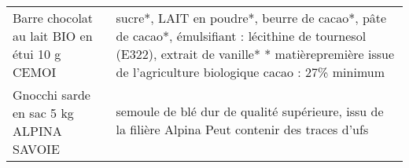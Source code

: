 \begin{longtable}{p{5cm}p{10cm}}
                                                            Barre chocolat au lait BIO en étui 10 g CEMOI &                                                                                                                                                                                                                                                                                                                                                                                                                                                                                                                                                                                                                                                                                                                                                                                                                                   sucre*, LAIT en poudre*, beurre de cacao*, pâte de cacao*, émulsifiant : lécithine de tournesol (E322), extrait de  vanille*  * matièrepremière issue de l'agriculture biologique  cacao : 27\% minimum \\
                                                                  Gnocchi sarde en sac 5 kg ALPINA SAVOIE &                                                                                                                                                                                                                                                                                                                                                                                                                                                                                                                                                                                                                                                                                                                                                                                                                                                                                                                                     semoule de blé dur de qualité supérieure, issu de la filière Alpina  Peut contenir des traces d'ufs \\

\end{longtable}
